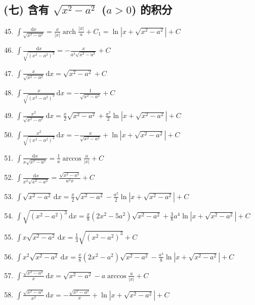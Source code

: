 \subsection*{(七) 含有 $\sqrt{x^2 - a^2}$ ($a > 0$) 的积分}

\begin{enumerate}
    \setcounter{enumi}{44}
    \item $\displaystyle \int \frac{\mathrm{d}x}{\sqrt{x^2 - a^2}} = \frac{x}{|x|} \operatorname{arch} \frac{|x|}{a} + C_1 = \ln \left| x + \sqrt{x^2 - a^2} \right| + C$
    \item $\displaystyle \int \frac{\mathrm{d}x}{\sqrt{(x^2 - a^2)^3}} = -\frac{x}{a^2 \sqrt{x^2 - a^2}} + C$
    \item $\displaystyle \int \frac{x}{\sqrt{x^2 - a^2}} \, \mathrm{d}x = \sqrt{x^2 - a^2} + C$
    \item $\displaystyle \int \frac{x}{\sqrt{(x^2 - a^2)^3}} \, \mathrm{d}x = -\frac{1}{\sqrt{x^2 - a^2}} + C$
    \item $\displaystyle \int \frac{x^2}{\sqrt{x^2 - a^2}} \, \mathrm{d}x = \frac{x}{2} \sqrt{x^2 - a^2} + \frac{a^2}{2} \ln \left| x + \sqrt{x^2 - a^2} \right| + C$
    \item $\displaystyle \int \frac{x^2}{\sqrt{(x^2 - a^2)^3}} \, \mathrm{d}x = -\frac{x}{\sqrt{x^2 - a^2}} + \ln \left| x + \sqrt{x^2 - a^2} \right| + C$
    \item $\displaystyle \int \frac{\mathrm{d}x}{x \sqrt{x^2 - a^2}} = \frac{1}{a} \arccos \frac{a}{|x|} + C$
    \item $\displaystyle \int \frac{\mathrm{d}x}{x^2 \sqrt{x^2 - a^2}} = \frac{\sqrt{x^2 - a^2}}{a^2 x} + C$
    \item $\displaystyle \int \sqrt{x^2 - a^2} \, \mathrm{d}x = \frac{x}{2} \sqrt{x^2 - a^2} - \frac{a^2}{2} \ln \left| x + \sqrt{x^2 - a^2} \right| + C$
    \item $\displaystyle \int \sqrt{(x^2 - a^2)^3} \, \mathrm{d}x = \frac{x}{8} (2x^2 - 5a^2) \sqrt{x^2 - a^2} + \frac{3}{8} a^4 \ln \left| x + \sqrt{x^2 - a^2} \right| + C$
    \item $\displaystyle \int x \sqrt{x^2 - a^2} \, \mathrm{d}x = \frac{1}{3} \sqrt{(x^2 - a^2)^3} + C$
    \item $\displaystyle \int x^2 \sqrt{x^2 - a^2} \, \mathrm{d}x = \frac{x}{8} (2x^2 - a^2) \sqrt{x^2 - a^2} - \frac{a^4}{8} \ln \left| x + \sqrt{x^2 - a^2} \right| + C$
    \item $\displaystyle \int \frac{\sqrt{x^2 - a^2}}{x} \, \mathrm{d}x = \sqrt{x^2 - a^2} - a \arccos \frac{a}{|x|} + C$
    \item $\displaystyle \int \frac{\sqrt{x^2 - a^2}}{x^2} \, \mathrm{d}x = -\frac{\sqrt{x^2 - a^2}}{x} + \ln \left| x + \sqrt{x^2 - a^2} \right| + C$
\end{enumerate}

